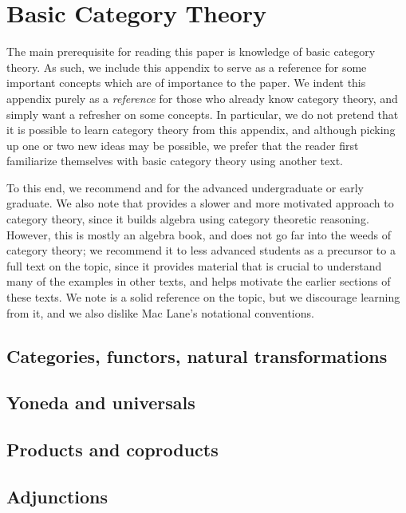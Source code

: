 \section{Basic Category Theory}\label{secA}

The main prerequisite for reading this paper is knowledge of basic category theory. As such, we include this appendix to serve as a reference for some important concepts which are of importance to the paper. We indent this appendix purely as a \emph{reference} for those who already know category theory, and simply want a refresher on some concepts. In particular, we do not pretend that it is possible to learn category theory from this appendix, and although picking up one or two new ideas may be possible, we prefer that the reader first familiarize themselves with basic category theory using another text.

To this end, we recommend \cite{ctx} and \cite{lein} for the advanced undergraduate or early graduate. We also note that \cite{alg0} provides a slower and more motivated approach to category theory, since it builds algebra using category theoretic reasoning. However, this is mostly an algebra book, and does not go far into the weeds of category theory; we recommend it to less advanced students as a precursor to a full text on the topic, since it provides material that is crucial to understand many of the examples in other texts, and helps motivate the earlier sections of these texts. We note \cite{ml} is a solid reference on the topic, but we discourage learning from it, and we also dislike Mac Lane's notational conventions.

\subsection{Categories, functors, natural transformations}\label{secA.1}

\subsection{Yoneda and universals}\label{secA.2}

\subsection{Products and coproducts}\label{secA.3}

\subsection{Adjunctions}\label{secA.4}
